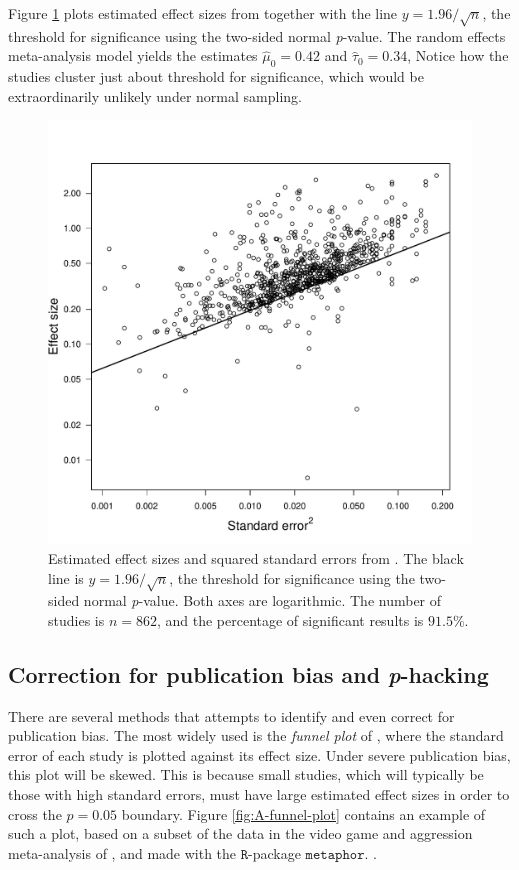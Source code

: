 Figure \ref{fig:motyl} plots estimated effect sizes from \textcite{Motyl2017-dx} together with the line $y=1.96/\sqrt{n}$, the threshold for significance using the two-sided normal \emph{p}-value. The random effects meta-analysis model yields the estimates $\hat{\mu}_{0}=0.42$ and $\hat{\tau}_{0}=0.34$, Notice how the studies cluster just about threshold for significance, which would be extraordinarily unlikely under normal sampling.
\begin{figure}
\label{fig:motyl}
\noindent \begin{centering}
\includegraphics[scale=0.5]{figures/motyl}
\par\end{centering}
\caption{Estimated effect sizes and squared standard errors from \textcite{Motyl2017-dx}. The black line is $y=1.96/\sqrt{n}$, the threshold for significance using the two-sided normal \emph{p}-value. Both axes are logarithmic. The number of studies is $n=862$, and the percentage of significant results is $91.5\%$.}
\end{figure}
\subsection{Correction for publication bias and \textit{p}-hacking}

There are several methods that attempts to identify and even correct for publication bias. The most widely used is the \emph{funnel plot} of \textcite{Egger1998-kj}, where the standard error of each study is plotted against its effect size. Under severe publication bias, this plot will be skewed. This is because small studies, which will typically be those with high standard errors, must have large estimated effect sizes in order to cross the $p=0.05$ boundary. Figure \ref{fig:A-funnel-plot} contains an example of such a plot, based on a subset of the data in the video game and aggression meta-analysis of \textcite{Anderson2010-ki}, and made with the $\mathtt{R}$-package $\mathtt{metaphor}$. \parencite{viechtbauer_conducting_2010}.

